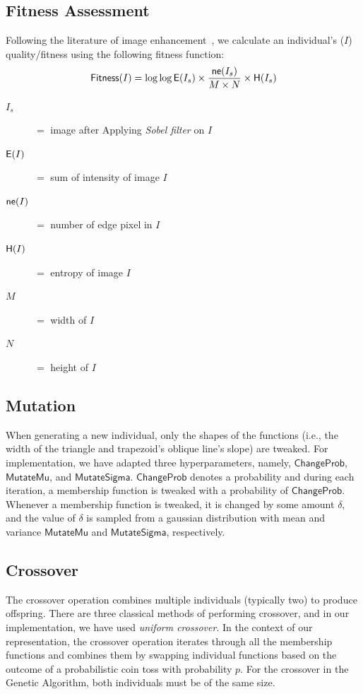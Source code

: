 \subsection{Fitness Assessment}
\label{subsection:fitness_assessment}
Following the literature of image enhancement~\cite{munteanu2004gray}, we calculate an individual's ($I$) quality/fitness using the following fitness function: 
\begin{equation} \label{eqn:fitness}
\mathsf{Fitness}(I) = \log{\log{\mathsf{E}(I_s)}} \times \frac{\mathsf{ne}(I_s)}{M \times N} \times \mathsf{H}(I_s)
\end{equation}
\begin{description}
    \item[$I_s$] $=$ image after Applying {\em Sobel filter} on $I$
    \item[$\mathsf{E}(I)$] $=$ sum of intensity of image $I$
    \item[$\mathsf{ne}(I)$] $=$ number of edge pixel in $I$
    \item[$\mathsf{H}(I)$] $=$ entropy of image $I$
    \item[$M$] $=$ width of $I$
    \item[$N$] $=$ height of $I$
\end{description}

\subsection{Mutation}
\label{subsec:mutation}
When generating a new individual, only the shapes of the functions (i.e., the width of the triangle and trapezoid's oblique line's slope) are tweaked. 
For implementation, we have adapted three hyperparameters, namely, $\mathsf{ChangeProb}$, $\mathsf{MutateMu}$, and $\mathsf{MutateSigma}$. 
$\mathsf{ChangeProb}$ denotes a probability and during each iteration, a membership function is tweaked with a probability of $\mathsf{ChangeProb}$. 
Whenever a membership function is tweaked, it is changed by some amount $\delta$, and 
the value of $\delta$ is sampled from a gaussian distribution with mean and variance $\mathsf{MutateMu}$ and $\mathsf{MutateSigma}$, respectively.

\subsection{Crossover}
\label{subsec:crossover}
The crossover operation combines multiple individuals (typically two) to produce offspring. There are three classical methods of performing crossover, and in our implementation, we have used {\em uniform crossover}. In the context of our representation, the crossover operation iterates through all the membership functions and combines them by swapping individual functions based on the outcome of a probabilistic coin toss with probability $p$. 
For the crossover in the Genetic Algorithm, both individuals must be of the same size.

